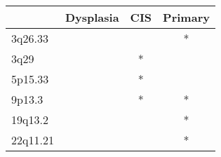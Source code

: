 \begin{tabular}{lccc}
\toprule
{} & Dysplasia & CIS & Primary \\
\midrule
3q26.33  &           &     &       * \\
3q29     &           &   * &         \\
5p15.33  &           &   * &         \\
9p13.3   &           &   * &       * \\
19q13.2  &           &     &       * \\
22q11.21 &           &     &       * \\
\bottomrule
\end{tabular}
